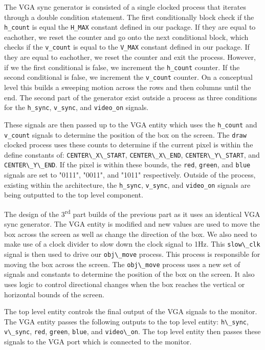 \documentclass{article}
\newcommand{\code}[1]{\lstinline|#1|}
\begin{document}
The VGA sync generator is consisted of a single clocked process that iterates through a double condition statement. The first conditionally block check if the \code{h_count} is equal the \code{H_MAX} constant defined in our package. If they are equal to eachother, we reset the counter and go onto the next conditional block, which checks if the \code{v_count} is equal to the \code{V_MAX} constant defined in our package. If they are equal to eachother, we reset the counter and exit the process. However, if we the first conditional is false, we increment the \code{h_count} counter. If the second conditional is false, we increment the \code{v_count} counter. On a conceptual level this builds a sweeping motion across the rows and then columns until the end. The second part of the generator exist outside a process as three conditions for the \code{h_sync}, \code{v_sync}, and \code{video_on} signals.

These signals are then passed up to the VGA entity which uses the \code{h_count} and \code{v_count} signals to determine the position of the box on the screen. The \code{draw} clocked process uses these counts to determine if the current pixel is within the define constants of: \code{CENTER\_X\_START}, \code{CENTER\_X\_END}, \code{CENTER\_Y\_START}, and \code{CENTER\_Y\_END}. If the pixel is within these bounds, the \code{red}, \code{green}, and \code{blue} signals are set to "0111", "0011", and "1011" respectively. Outside of the process, existing within the architecture, the \code{h_sync}, \code{v_sync}, and \code{video_on} signals are being outputted to the top level component.

The design of the 3\textsuperscript{rd} part builds of the previous part as it uses an identical VGA sync generator. The VGA entity is modified and new values are used to move the box across the screen as well as change the direction of the box. We also need to make use of a clock divider to slow down the clock signal to 1Hz. This \code{slow\_clk} signal is then used to drive our \code{obj\_move} process. This process is responsible for moving the box across the screen. The \code{obj\_move} process uses a new set of signals and constants to determine the position of the box on the screen. It also uses logic to control directional changes when the box reaches the vertical or horizontal bounds of the screen.

The top level entity controls the final output of the VGA signals to the monitor. The VGA entity passes the following outputs to the top level entity: \code{h\_sync}, \code{v\_sync}, \code{red}, \code{green}, \code{blue}, and \code{video\_on}. The top level entity then passes these signals to the VGA port which is connected to the monitor. 
\end{document}
